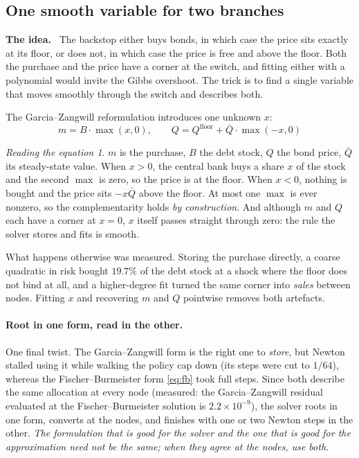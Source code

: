\documentclass[10pt,a4paper]{article}
\newenvironment{idea}{\begin{shaded}\noindent\textbf{The idea.}\ }{\end{shaded}}
\theoremstyle{plain}
\theoremstyle{remark}
\newtheorem*{reading}{Reading the equation}
\begin{document}
\subsection{One smooth variable for two branches}
\label{sec:gz}

\begin{idea}
The backstop either buys bonds, in which case the price sits exactly at its floor, or does not, in
which case the price is free and above the floor. Both the purchase and the price have a corner at
the switch, and fitting either with a polynomial would invite the Gibbs overshoot. The trick is to
find a single variable that moves smoothly through the switch and describes both.
\end{idea}

\noindent The Garcia--Zangwill reformulation introduces one unknown $x$:
\begin{equation}
  \boxed{\;m = B\cdot\max(x,0),\qquad Q = Q^{\mathrm{floor}} + \bar Q\cdot\max(-x,0)\;}
  \label{eq:gz}
\end{equation}

\begin{reading}
$m$ is the purchase, $B$ the debt stock, $Q$ the bond price, $\bar Q$ its steady-state value.
When $x>0$, the central bank buys a share $x$ of the stock and the second $\max$ is zero, so the
price is at the floor. When $x<0$, nothing is bought and the price sits $-x\bar Q$ above the floor.
At most one $\max$ is ever nonzero, so the complementarity holds \emph{by construction}. And
although $m$ and $Q$ each have a corner at $x=0$, $x$ itself passes straight through zero: the rule
the solver stores and fits is smooth.
\end{reading}

\noindent What happens otherwise was measured. Storing the purchase directly, a coarse quadratic in
risk bought $19.7\%$ of the debt stock at a shock where the floor does not bind at all, and a
higher-degree fit turned the same corner into \emph{sales} between nodes. Fitting $x$ and recovering
$m$ and $Q$ pointwise removes both artefacts.

\paragraph{Root in one form, read in the other.} One final twist. The Garcia--Zangwill form is the
right one to \emph{store}, but Newton stalled using it while walking the policy cap down (its
steps were cut to $1/64$), whereas the Fischer--Burmeister form \eqref{eq:fb} took full steps. Since
both describe the same allocation at every node (measured: the Garcia--Zangwill residual evaluated
at the Fischer--Burmeister solution is $2.2\times10^{-9}$), the solver roots in one form, converts at
the nodes, and finishes with one or two Newton steps in the other. \emph{The formulation that is good
for the solver and the one that is good for the approximation need not be the same; when they agree
at the nodes, use both.}
\end{document}
